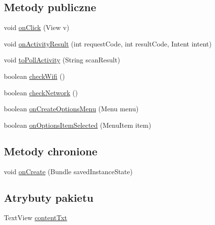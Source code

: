 \subsection*{Metody publiczne}
\begin{DoxyCompactItemize}
\item 
void \hyperlink{classcom_1_1example_1_1qrpoll_1_1_main_activity_a400e30efc907d9726298482730d4243d}{on\+Click} (View v)
\item 
void \hyperlink{classcom_1_1example_1_1qrpoll_1_1_main_activity_ab7dc0b400a4156ce07ec51712c638b5b}{on\+Activity\+Result} (int request\+Code, int result\+Code, Intent intent)
\item 
void \hyperlink{classcom_1_1example_1_1qrpoll_1_1_main_activity_ac108fe2528d7657f970d61d49639e6ac}{to\+Poll\+Activity} (String scan\+Result)
\item 
boolean \hyperlink{classcom_1_1example_1_1qrpoll_1_1_main_activity_a0433b5df97dcca7db8593f32d8d033b9}{check\+Wifi} ()
\item 
boolean \hyperlink{classcom_1_1example_1_1qrpoll_1_1_main_activity_af92255e3a196405eeb55e06bb625d435}{check\+Network} ()
\item 
boolean \hyperlink{classcom_1_1example_1_1qrpoll_1_1_main_activity_adbf1a4ac0f7940113677f58a1d85f295}{on\+Create\+Options\+Menu} (Menu menu)
\item 
boolean \hyperlink{classcom_1_1example_1_1qrpoll_1_1_main_activity_acb1d82fc0d1505cc54762cb028826c3c}{on\+Options\+Item\+Selected} (Menu\+Item item)
\end{DoxyCompactItemize}
\subsection*{Metody chronione}
\begin{DoxyCompactItemize}
\item 
void \hyperlink{classcom_1_1example_1_1qrpoll_1_1_main_activity_a6870a3a43acb7f6024f45467a0a786fd}{on\+Create} (Bundle saved\+Instance\+State)
\end{DoxyCompactItemize}
\subsection*{Atrybuty pakietu}
\begin{DoxyCompactItemize}
\item 
Text\+View \hyperlink{classcom_1_1example_1_1qrpoll_1_1_main_activity_aee6c7adea75224ec647353db3ca58124}{content\+Txt}
\end{DoxyCompactItemize}
